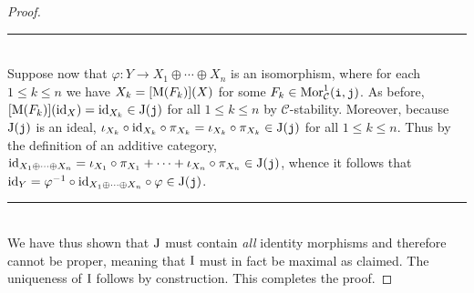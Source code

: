 \begin{proof}
\begin{center}
\rule{0.5\linewidth}{1pt}
\end{center}
\noindent\\[-\baselineskip]
\noindent Suppose now that $\varphi : Y \to X_1 \oplus \cdots \oplus X_n$ is an isomorphism, where for each  $1 \leq k \leq n$ we have $X_k = [\textup{M}(F_k)](X)$ for some $F_k \in \textup{Mor}_\mathcal{C}^1(\textup{\texttt{i}}, \textup{\texttt{j}})$. As before, $[\textup{M}(F_k)](\textup{id}_X) = \textup{id}_{X_k} \in \textup{J}(\textup{\texttt{j}})$ for all $1 \leq k \leq n$ by $\mathscr{C}$-stability. Moreover, because $\textup{J}(\textup{\texttt{j}})$ is an ideal, $\iota_{X_k} \circ \textup{id}_{X_k} \circ \pi_{X_k} = \iota_{X_k} \circ \pi_{X_k} \in \textup{J}(\textup{\texttt{j}})$ for all $1 \leq k \leq n$. Thus by the definition of an additive category, $\textup{id}_{X_1 \oplus \cdots \oplus X_n} = \iota_{X_1} \circ \pi_{X_1} + \cdots + \iota_{X_n} \circ \pi_{X_n} \in \textup{J}(\textup{\texttt{j}})$, whence it follows that $\textup{id}_Y = \varphi^{-1} \circ \textup{id}_{X_1 \oplus \cdots \oplus X_n} \circ \varphi \in \textup{J}(\textup{\texttt{j}})$.\\[-1.5\baselineskip]
\begin{center}
\rule{0.5\linewidth}{1pt}
\end{center}
\noindent\\[-\baselineskip]
\noindent We have thus shown that $\textup{J}$ must contain {\em all} identity morphisms and therefore cannot be proper, meaning that $\textup{I}$ must in fact be maximal as claimed. The uniqueness of $\textup{I}$ follows by construction. This completes the proof.
\end{proof}\\

